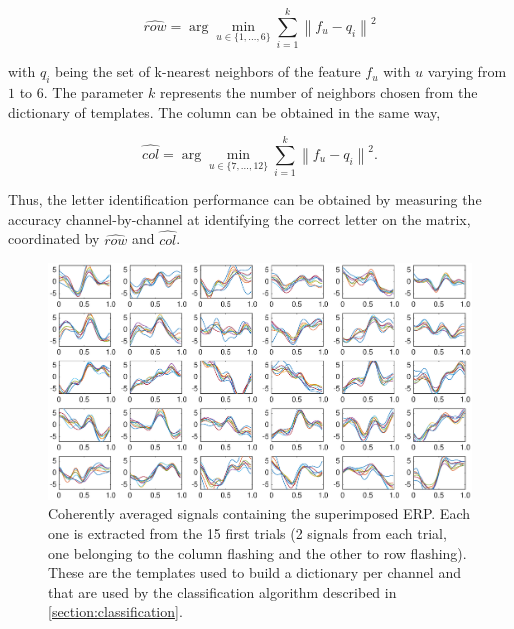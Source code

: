 \documentclass[brainsci,article,submit,moreauthors,pdftex,10pt,a4paper]{mdpi}
\begin{document}
\begin{equation}
\hat{row} = \arg \min_{u \in \{1,\dots,6\}} \sum_{i=1}^{k} \left\lVert f_u - q_i \right\rVert ^2
\label{eq:multiclassificationrow}
\end{equation}

\noindent with $q_i$ being the set of k-nearest neighbors of the feature $f_u$ with $u$ varying from $1$ to $6$.  The parameter $k$ represents the number of neighbors chosen from the dictionary of templates.  The column can be obtained in the same way,

\begin{equation}
\hat{col} = \arg \min_{u \in \{7,\dots,12\}} \sum_{i=1}^{k} \left\lVert f_u - q_i \right\rVert ^2.
\label{eq:multiclassificationcol}
\end{equation}

Thus, the letter identification performance can be obtained by measuring the accuracy channel-by-channel at identifying the correct letter on the matrix, coordinated by $ \hat{row} $ and $ \hat{col} $.





\begin{figure}[H]
\centering
\includegraphics[width=15cm]{images/dictionary.eps}
\caption{Coherently averaged signals containing the superimposed ERP.  Each one is extracted from the 15 first trials (2 signals from each trial, one belonging to the column flashing and the other to row flashing).  These are the templates used to build a dictionary per channel and that are used by the classification algorithm described in \ref{section:classification}.}
\label{fig:dictionaryfig}
\end{figure}
\end{document}
